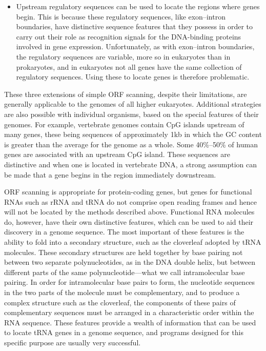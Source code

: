 \begin{itemize}
	\item Upstream regulatory sequences can be used to locate the regions where genes begin. This is because these regulatory sequences, like exon–intron
	boundaries, have distinctive sequence features that they possess in order to carry out their role as recognition signals for the DNA-binding proteins
	involved in gene expression. Unfortunately, as with exon–intron boundaries, the regulatory sequences are variable, more so in eukaryotes than in prokaryotes, 
	and in eukaryotes not all genes have the same collection of regulatory sequences. Using these to locate genes is therefore problematic.
\end{itemize}

These three extensions of simple ORF scanning, despite their limitations, are generally applicable to the genomes of all higher eukaryotes. Additional
strategies are also possible with individual organisms, based on the special features of their genomes. For example, vertebrate genomes contain CpG
islands upstream of many genes, these being sequences of approximately 1kb in which the GC content is greater than the average for the genome as a
whole. Some 40\%–50\% of human genes are associated with an upstream CpG island. These sequences are distinctive and when one is located in vertebrate
DNA, a strong assumption can be made that a gene begins in the region immediately downstream.

ORF scanning is appropriate for protein-coding genes, but genes for functional RNAs such as rRNA and tRNA do not comprise open reading frames and hence 
will not be located by the methods described above. Functional RNA molecules do, however, have their own distinctive features, which can be used to aid 
their discovery in a genome sequence. The most important of these features is the ability to fold into a secondary structure, such as the cloverleaf 
adopted by tRNA molecules. These secondary structures are held together by base pairing not between two separate polynucleotides, as in the DNA double helix, 
but between different parts of the same polynucleotide—what we call intramolecular base pairing. In order for intramolecular base pairs to form, the
nucleotide sequences in the two parts of the molecule must be complementary, and to produce a complex structure such as the cloverleaf, the components of these 
pairs of complementary sequences must be arranged in a characteristic order within the RNA sequence. These features provide a wealth of information that 
can be used to locate tRNA genes in a genome sequence, and programs designed for this specific purpose are usually very successful.

